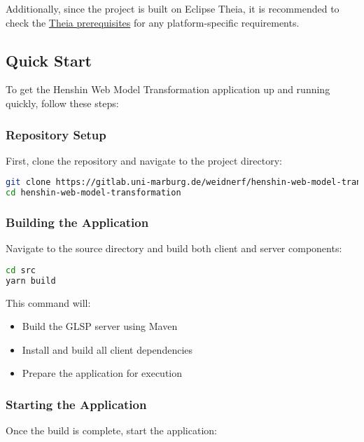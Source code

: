Additionally, since the project is built on Eclipse Theia, it is recommended to check the \href{https://github.com/eclipse-theia/theia/blob/master/doc/Developing.md\#prerequisites}{Theia prerequisites} for any platform-specific requirements.

\subsection{Quick Start}
\label{subsec:quick_start}

To get the Henshin Web Model Transformation application up and running quickly, follow these steps:

\subsubsection{Repository Setup}

First, clone the repository and navigate to the project directory:

\begin{lstlisting}[language=bash]
git clone https://gitlab.uni-marburg.de/weidnerf/henshin-web-model-transformation.git
cd henshin-web-model-transformation
\end{lstlisting}

\subsubsection{Building the Application}

Navigate to the source directory and build both client and server components:

\begin{lstlisting}[language=bash]
cd src
yarn build
\end{lstlisting}

This command will:
\begin{itemize}
    \item Build the GLSP server using Maven
    \item Install and build all client dependencies
    \item Prepare the application for execution
\end{itemize}

\subsubsection{Starting the Application}

Once the build is complete, start the application:

